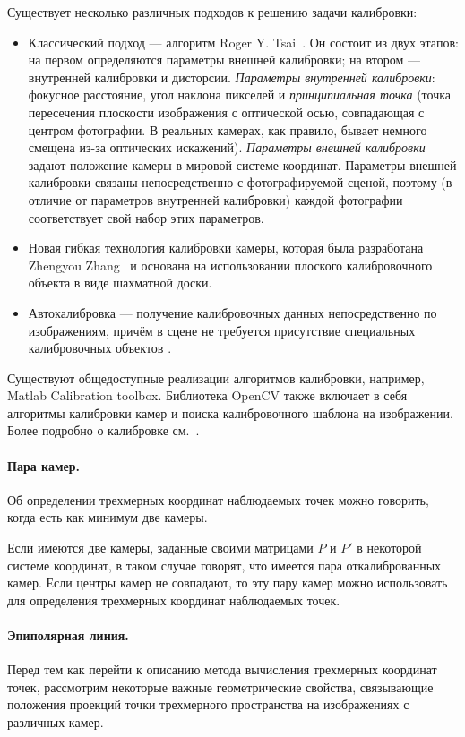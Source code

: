 \documentclass[oneside,final,12pt]{scrartcl}
\begin{document}
			Существует несколько различных подходов к решению задачи калибровки:
			\begin{itemize}
				\item Классический подход — алгоритм Roger Y. Tsai~\cite{Tsai1984}. Он состоит из двух этапов: на первом определяются параметры внешней калибровки; на втором — внутренней калибровки и дисторсии. \textit{Параметры внутренней  калибровки}: фокусное расстояние, угол наклона пикселей и \textit{принципиальная точка} (точка пересечения плоскости изображения с оптической осью, совпадающая с центром фотографии. В реальных камерах, как правило, бывает немного смещена из-за оптических искажений). \textit{Параметры внешней калибровки} задают положение камеры в мировой системе координат. Параметры внешней калибровки связаны непосредственно с фотографируемой сценой, поэтому (в отличие от параметров внутренней калибровки) каждой фотографии соответствует свой набор этих параметров.

				\item Новая гибкая технология калибровки камеры, которая была разработана Zhengyou Zhang~\cite{Zhang2000} и основана на использовании плоского калибровочного объекта в виде шахматной доски.

				\item Автокалибровка — получение калибровочных данных непосредственно по изображениям, причём в сцене не требуется присутствие специальных калибровочных объектов \cite{Frey}.
			\end{itemize}

			Существуют общедоступные реализации алгоритмов калибровки, например, Matlab Calibration toolbox. Библиотека OpenCV также включает в себя алгоритмы калибровки камер и поиска калибровочного шаблона на изображении. Более подробно о калибровке см.~\cite{Hartley2003}.

			\paragraph{Пара камер.} Об определении трехмерных координат наблюдаемых точек можно говорить, когда есть как минимум две камеры.

			Если имеются две камеры, заданные своими матрицами \(P\) и \(P'\) в некоторой системе координат, в таком случае говорят, что имеется пара откалиброванных камер. Если центры камер не совпадают, то эту пару камер можно использовать для определения трехмерных координат наблюдаемых точек.

			\paragraph{Эпиполярная линия.} Перед тем как перейти к описанию метода вычисления трехмерных координат точек, рассмотрим некоторые важные геометрические свойства, связывающие положения проекций точки трехмерного пространства на изображениях с различных камер.
\end{document}
